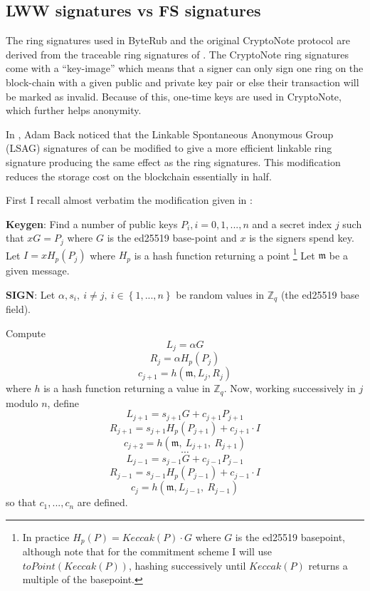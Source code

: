 \documentclass[12pt,oneside,english]{amsart}
\numberwithin{equation}{section}
\numberwithin{figure}{section}
\theoremstyle{plain}
\theoremstyle{plain}
\theoremstyle{remark}
\theoremstyle{plain}
\theoremstyle{remark}
\theoremstyle{remark}
\theoremstyle{plain}
\theoremstyle{definition}
\begin{document}
\subsection{\label{sub:BackLSAG}LWW signatures vs FS signatures}

The ring signatures used in ByteRub and the original CryptoNote protocol are
derived from the traceable ring signatures of \cite{FS}. The CryptoNote \cite{CN}
ring signatures come with a ``key-image'' which means that a signer
can only sign one ring on the block-chain with a given public and
private key pair or else their transaction will be marked as invalid. Because of this, one-time keys are used in CryptoNote,
which further helps anonymity. 

In \cite{B}, Adam Back noticed that the Linkable Spontaneous Anonymous
Group (LSAG) signatures of \cite{LWW} can be modified to give a more efficient
linkable ring signature producing the same effect as the \cite{FS}
ring signatures. This modification reduces the storage cost on the
blockchain essentially in half.

First I recall almost verbatim the modification given in \cite{B}: 

\textbf{Keygen}: Find a number of public keys $P_{i},i=0,1,...,n$
and a secret index $j$ such that $xG=P_{j}$ where $G$ is the ed25519
base-point and $x$ is the signers spend key. Let $I=xH_p\left(P_{j}\right)$
where $H_p$ is a hash function returning a point \footnote{In practice $H_p(P) = Keccak(P)\cdot G$ where $G$ is the ed25519 basepoint, although note that for the commitment scheme I will use $toPoint(Keccak(P))$, hashing successively until $Keccak(P)$ returns a multiple of the basepoint.}
Let $\mathfrak{m}$ be a given message. 

\textbf{SIGN}: Let $\alpha,s_{i},\ i\neq j,\ i\in\left\{ 1,...,n\right\} $
be random values in $\mathbb{Z}_{q}$ (the ed25519 base field). 

Compute
\[
L_{j}=\alpha G
\]
\[
R_{j}=\alpha H_p\left(P_{j}\right)
\]
\[
c_{j+1}=h\left(\mathfrak{m},L_{j},R_{j}\right)
\]
 where $h$ is a hash function returning a value in $\mathbb{Z}_{q}$.
Now, working successively in $j$ modulo $n$, define 
\[
L_{j+1}=s_{j+1}G+c_{j+1}P_{j+1}
\]
\[
R_{j+1}=s_{j+1}H_p\left(P_{j+1}\right)+c_{j+1}\cdot I
\]
\[
c_{j+2}=h\left(\mathfrak{m},\ L_{j+1},\ R_{j+1}\right)
\]
\[
\cdots
\]
\[
L_{j-1}=s_{j-1}G+c_{j-1}P_{j-1}
\]
\[
R_{j-1}=s_{j-1}H_p\left(P_{j-1}\right)+c_{j-1}\cdot I
\]
\[
c_{j}=h\left(\mathfrak{m},L_{j-1},\ R_{j-1}\right)
\]
 so that $c_{1},...,c_{n}$ are defined. 
\end{document}

